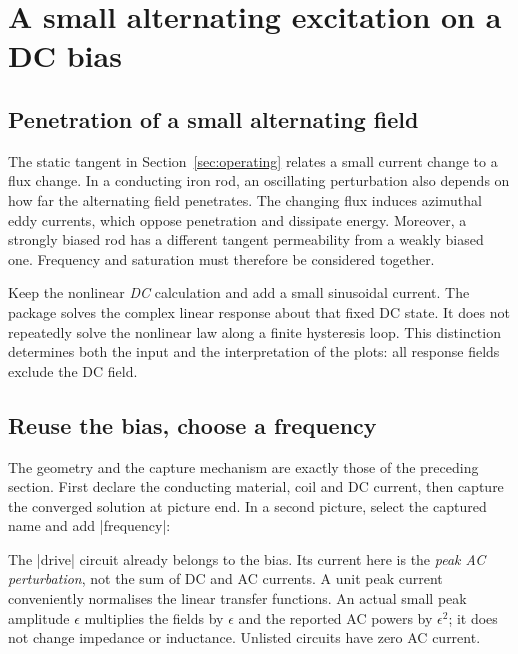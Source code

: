 \section{A small alternating excitation on a DC bias}
\label{sec:biased-harmonic}

\subsection{Penetration of a small alternating field}
The static tangent in Section~\ref{sec:operating} relates a small current
change to a flux change. In a conducting iron rod, an oscillating perturbation
also depends on how far the alternating field penetrates.
The changing flux induces azimuthal eddy currents, which oppose penetration
and dissipate energy. Moreover, a strongly biased rod has a different tangent
permeability from a weakly biased one. Frequency and saturation must therefore
be considered together.

Keep the nonlinear \emph{DC} calculation and add a small sinusoidal
current. The package solves the complex linear response about that fixed DC
state. It does not repeatedly solve the nonlinear law along a finite hysteresis
loop. This distinction determines both the input and the interpretation of the
plots: all response fields exclude the DC field.

\subsection{Reuse the bias, choose a frequency}
The geometry and the capture mechanism are exactly those of the preceding
section. First declare the conducting material, coil and DC current,
then capture the converged solution at picture end.
In a second picture, select the captured name and add |frequency|:
\begin{codeexample}
\end{codeexample}
The |drive| circuit already belongs to the bias. Its current here is the
\emph{peak AC perturbation}, not the sum of DC and AC currents. A unit peak
current conveniently normalises the linear transfer functions. An actual
small peak amplitude $\epsilon$ multiplies the fields by $\epsilon$ and the
reported AC powers by $\epsilon^2$; it does not change impedance or inductance.
Unlisted circuits have zero AC current.

